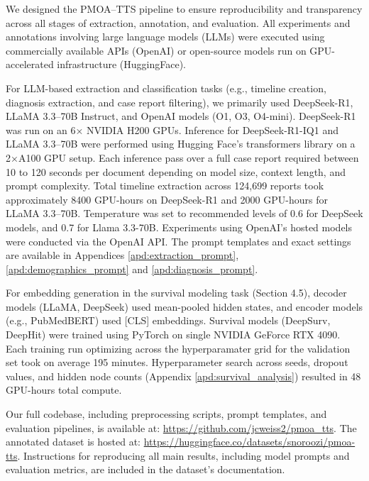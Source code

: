 We designed the PMOA–TTS pipeline to ensure reproducibility and transparency across all stages of extraction, annotation, and evaluation. All experiments and annotations involving large language models (LLMs) were executed using commercially available APIs (OpenAI) or open-source models run on GPU-accelerated infrastructure (HuggingFace).

For LLM-based extraction and classification tasks (e.g., timeline creation, diagnosis extraction, and case report filtering), we primarily used DeepSeek-R1, LLaMA 3.3–70B Instruct, and OpenAI models (O1, O3, O4-mini). DeepSeek-R1 was run on an 6× NVIDIA H200 GPUs. Inference for DeepSeek-R1-IQ1 and LLaMA 3.3–70B were performed using Hugging Face’s transformers library on a 2×A100 GPU setup. Each inference pass over a full case report required between 10 to 120 seconds per document depending on model size, context length, and prompt complexity. Total timeline extraction across 124,699 reports took approximately 8400 GPU-hours on DeepSeek-R1 and 2000 GPU-hours for LLaMA 3.3–70B.  Temperature was set to recommended levels of 0.6 for DeepSeek models, and 0.7 for Llama 3.3-70B.
Experiments using OpenAI’s hosted models were conducted via the OpenAI API.
The prompt templates and exact settings are available in Appendices \ref{apd:extraction_prompt}, \ref{apd:demographics_prompt} and \ref{apd:diagnosis_prompt}. 

For embedding generation in the survival modeling task (Section 4.5), decoder models (LLaMA, DeepSeek) used mean-pooled hidden states, and encoder models (e.g., PubMedBERT) used [CLS] embeddings. Survival models (DeepSurv, DeepHit) were trained using PyTorch on single NVIDIA GeForce RTX 4090. Each training run optimizing across the hyperparamater grid for the validation set took on average 195 minutes. Hyperparameter search across seeds, dropout values, and hidden node counts (Appendix \ref{apd:survival_analysis}) resulted in 48 GPU-hours total compute.

Our full codebase, including preprocessing scripts, prompt templates, and evaluation pipelines, is available at: \url{https://github.com/jcweiss2/pmoa_tts}. The annotated dataset is hosted at: \url{https://huggingface.co/datasets/snoroozi/pmoa-tts}. Instructions for reproducing all main results, including model prompts and evaluation metrics, are included in the dataset's documentation.

